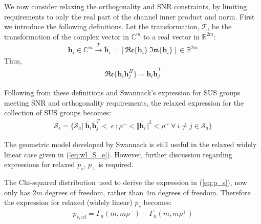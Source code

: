 We now consider relaxing the orthogonality and SNR constraints, by limiting  requirements to only the real part of the channel inner product and norm. First we introduce the following definitions. Let the  transformation, $\mathcal{T}$, be the transformation of the complex vector in $\mathbb{C}^m$ to a real vector in $\mathbb{R}^{2m}$:
\begin{equation}\label{eq:complex_real_xform}
    \begin{aligned}
        \textbf{h}_i \in \mathbb{C}^m \xrightarrow{\mathcal{T}} \overline{\textbf{h}}_i = [ \mathfrak{Re} \lbrace \textbf{h}_i \rbrace \ \mathfrak{Im}\lbrace \textbf{h}_i \rbrace ] \in \mathbb{R}^{2m}
    \end{aligned}
\end{equation}
Thus,
\begin{equation}\label{eq:orth_real_transp}
    \begin{aligned}
        \mathfrak{Re} \lbrace \textbf{h}_i\textbf{h}_j^H \rbrace = \overline{\textbf{h}}_i \overline{\textbf{h}}_j^T 
    \end{aligned}
\end{equation}

Following from these definitions and Swannack's expression for SUS groups meeting SNR and orthogonality requirements, the relaxed expression for the collection of SUS groups becomes:
\begin{equation}\label{eq:wl_S_e}
    \begin{aligned}
        \mathcal{S}_\epsilon = \lbrace \mathcal{S}_a \big|\  \overline{\textbf{h}}_i \overline{\textbf{h}}_j^T<\ \epsilon \ \text{;} \ \rho^-<\Vert \overline{\textbf{h}}_i \Vert^2 < \rho^+\ \forall \ i \neq j \in \mathcal{S}_a \rbrace
    \end{aligned}
\end{equation}

The geometric model developed by Swannack is still useful in the relaxed widely linear case given in (\ref{eq:wl_S_e}). However, further discussion regarding expressions for relaxed $p_s$, $p_\perp$ is required.

The Chi-squared distribution used to derive the expression in (\ref{eq:p_s}), now only has 2$m$ degrees of freedom, rather than 4$m$ degrees of freedom. Therefore the expression for relaxed (widely linear) $p_s$ becomes:
\begin{equation}\label{eq:p_s_real}
    \begin{aligned}
        p_{s,wl} = \Gamma_n(m,m\rho^-) - \Gamma_n(m,m\rho^+)
    \end{aligned}
\end{equation}

